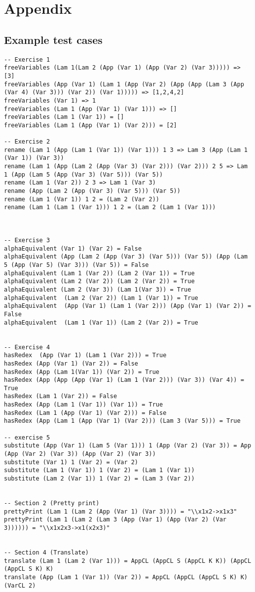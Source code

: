 \section{Appendix}
\subsection{Example test cases}
\begin{lstlisting}[style=code]
-- Exercise 1
freeVariables (Lam 1(Lam 2 (App (Var 1) (App (Var 2) (Var 3))))) => [3]
freeVariables (App (Var 1) (Lam 1 (App (Var 2) (App (App (Lam 3 (App (Var 4) (Var 3))) (Var 2)) (Var 1))))) => [1,2,4,2]
freeVariables (Var 1) => 1
freeVariables (Lam 1 (App (Var 1) (Var 1))) => []
freeVariables (Lam 1 (Var 1)) = []
freeVariables (Lam 1 (App (Var 1) (Var 2))) = [2]

-- Exercise 2
rename (Lam 1 (App (Lam 1 (Var 1)) (Var 1))) 1 3 => Lam 3 (App (Lam 1 (Var 1)) (Var 3))
rename (Lam 1 (App (Lam 2 (App (Var 3) (Var 2))) (Var 2))) 2 5 => Lam 1 (App (Lam 5 (App (Var 3) (Var 5))) (Var 5))
rename (Lam 1 (Var 2)) 2 3 => Lam 1 (Var 3)
rename (App (Lam 2 (App (Var 3) (Var 5))) (Var 5))
rename (Lam 1 (Var 1)) 1 2 = (Lam 2 (Var 2))
rename (Lam 1 (Lam 1 (Var 1))) 1 2 = (Lam 2 (Lam 1 (Var 1)))



-- Exercise 3
alphaEquivalent (Var 1) (Var 2) = False
alphaEquivalent (App (Lam 2 (App (Var 3) (Var 5))) (Var 5)) (App (Lam 5 (App (Var 5) (Var 3))) (Var 5)) = False
alphaEquivalent (Lam 1 (Var 2)) (Lam 2 (Var 1)) = True
alphaEquivalent (Lam 2 (Var 2)) (Lam 2 (Var 2)) = True
alphaEquivalent (Lam 2 (Var 3)) (Lam 1(Var 3)) = True
alphaEquivalent  (Lam 2 (Var 2)) (Lam 1 (Var 1)) = True
alphaEquivalent  (App (Var 1) (Lam 1 (Var 2))) (App (Var 1) (Var 2)) = False
alphaEquivalent  (Lam 1 (Var 1)) (Lam 2 (Var 2)) = True


-- Exercise 4
hasRedex  (App (Var 1) (Lam 1 (Var 2))) = True
hasRedex (App (Var 1) (Var 2)) = False
hasRedex (App (Lam 1(Var 1)) (Var 2)) = True
hasRedex (App (App (App (Var 1) (Lam 1 (Var 2))) (Var 3)) (Var 4)) = True
hasRedex (Lam 1 (Var 2)) = False
hasRedex (App (Lam 1 (Var 1)) (Var 1)) = True
hasRedex (Lam 1 (App (Var 1) (Var 2))) = False
hasRedex (App (Lam 1 (App (Var 1) (Var 2))) (Lam 3 (Var 5))) = True

-- exercise 5
substitute (App (Var 1) (Lam 5 (Var 1))) 1 (App (Var 2) (Var 3)) = App (App (Var 2) (Var 3)) (App (Var 2) (Var 3))
substitute (Var 1) 1 (Var 2) = (Var 2)
substitute (Lam 1 (Var 1)) 1 (Var 2) = (Lam 1 (Var 1))
substitute (Lam 2 (Var 1)) 1 (Var 2) = (Lam 3 (Var 2))


-- Section 2 (Pretty print)
prettyPrint (Lam 1 (Lam 2 (App (Var 1) (Var 3)))) = "\\x1x2->x1x3"
prettyPrint (Lam 1 (Lam 2 (Lam 3 (App (Var 1) (App (Var 2) (Var 3)))))) = "\\x1x2x3->x1(x2x3)"


-- Section 4 (Translate)
translate (Lam 1 (Lam 2 (Var 1))) = AppCL (AppCL S (AppCL K K)) (AppCL (AppCL S K) K)
translate (App (Lam 1 (Var 1)) (Var 2)) = AppCL (AppCL (AppCL S K) K) (VarCL 2)
\end{lstlisting}


